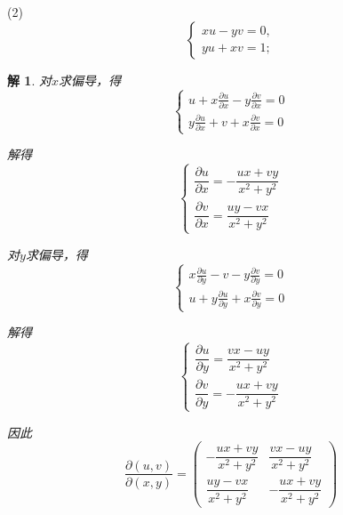 \documentclass[a4paper,12pt]{article}
\newtheorem*{sol}{解}
\begin{document}
(2)
$$
    \begin{cases}
        xu - yv = 0, \\
        yu + xv = 1;
    \end{cases}
$$
\begin{sol}
    对$x$求偏导，得
    $$\begin{cases}
            u + x\frac{\partial u}{\partial x} - y\frac{\partial v}{\partial x} = 0 \\
            y\frac{\partial u}{\partial x} + v + x\frac{\partial v}{\partial x} = 0
        \end{cases}$$

    解得
    $$\begin{cases}
            \dfrac{\partial u}{\partial x} = -\dfrac{ux + vy}{x^2 + y^2} \\[10pt]
            \dfrac{\partial v}{\partial x} = \dfrac{uy - vx}{x^2 + y^2}
        \end{cases}$$

    对$y$求偏导，得
    $$\begin{cases}
            x\frac{\partial u}{\partial y} - v - y\frac{\partial v}{\partial y} = 0 \\
            u + y\frac{\partial u}{\partial y} + x\frac{\partial v}{\partial y} = 0
        \end{cases}$$

    解得
    $$\begin{cases}
            \dfrac{\partial u}{\partial y} = \dfrac{vx - uy}{x^2 + y^2} \\[10pt]
            \dfrac{\partial v}{\partial y} = -\dfrac{ux + vy}{x^2 + y^2}
        \end{cases}$$

    因此
    $$\frac{\partial(u,v)}{\partial(x,y)} = \begin{pmatrix}
            -\dfrac{ux + vy}{x^2 + y^2} & \dfrac{vx - uy}{x^2 + y^2}  \\[10pt]
            \dfrac{uy - vx}{x^2 + y^2}  & -\dfrac{ux + vy}{x^2 + y^2}
        \end{pmatrix}$$
\end{sol}
\end{document}
